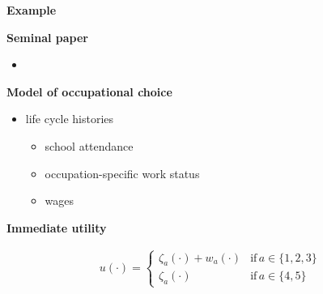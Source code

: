 \begin{frame}\begin{center}
\LARGE\textbf{Example}
\end{center}\end{frame}
\begin{frame}\textbf{Seminal paper}\vspace{0.3cm}
\begin{itemize}
\item {}
\end{itemize}
\end{frame}
\begin{frame}\textbf{Model of occupational choice}\vspace{0.3cm}

\begin{itemize}\setlength\itemsep{1em}
\item life cycle histories \medskip
\begin{itemize}\setlength\itemsep{1em}
\item school attendance
\item occupation-specific work status
\item wages
\end{itemize}
\end{itemize}
\end{frame}
\begin{frame}\textbf{Immediate utility}\vspace{0.3cm}

  \begin{align*}
  u(\cdot) =
  \begin{cases}
      \zeta_a(\cdot)  + w_a(\cdot)                & \text{if}\, a \in \{1, 2, 3\}  \\
      \zeta_a(\cdot)                                                  &  \text{if}\, a \in \{4, 5\}
  \end{cases}
  \end{align*}

\end{frame}
